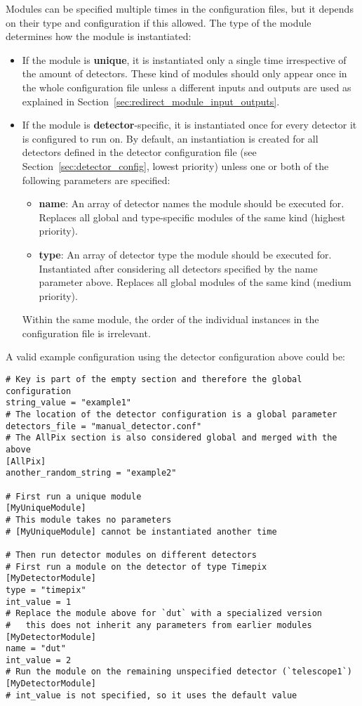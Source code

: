 Modules can be specified multiple times in the configuration files, but it depends on their type and configuration if this allowed.
The type of the module determines how the module is instantiated:
\begin{itemize}
\item If the module is \textbf{unique}, it is instantiated only a single time irrespective of the amount of detectors.
These kind of modules should only appear once in the whole configuration file unless a different inputs and outputs are used as explained in Section~\ref{sec:redirect_module_input_outputs}.
\item If the module is \textbf{detector}-specific, it is instantiated once for every detector it is configured to run on.
By default, an instantiation is created for all detectors defined in the detector configuration file (see Section~\ref{sec:detector_config}, lowest priority) unless one or both of the following parameters are specified:
\begin{itemize}
\item \textbf{name}: An array of detector names the module should be executed for.
Replaces all global and type-specific modules of the same kind (highest priority).
\item \textbf{type}: An array of detector type the module should be executed for.
Instantiated after considering all detectors specified by the name parameter above.
Replaces all global modules of the same kind (medium priority).
\end{itemize}
Within the same module, the order of the individual instances in the configuration file is irrelevant.
\end{itemize}

A valid example configuration using the detector configuration above could be:
\begin{verbatim}
# Key is part of the empty section and therefore the global configuration
string_value = "example1"
# The location of the detector configuration is a global parameter
detectors_file = "manual_detector.conf"
# The AllPix section is also considered global and merged with the above
[AllPix]
another_random_string = "example2"

# First run a unique module
[MyUniqueModule]
# This module takes no parameters
# [MyUniqueModule] cannot be instantiated another time

# Then run detector modules on different detectors
# First run a module on the detector of type Timepix
[MyDetectorModule]
type = "timepix"
int_value = 1
# Replace the module above for `dut` with a specialized version
#   this does not inherit any parameters from earlier modules
[MyDetectorModule]
name = "dut"
int_value = 2
# Run the module on the remaining unspecified detector (`telescope1`)
[MyDetectorModule]
# int_value is not specified, so it uses the default value
\end{verbatim}

